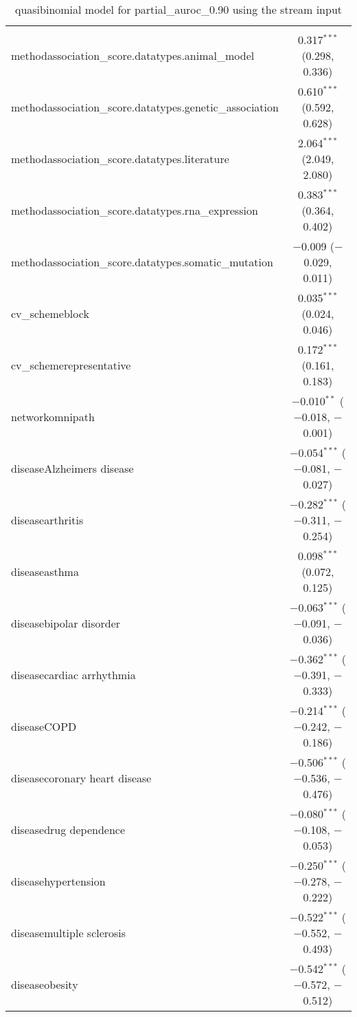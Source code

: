 
\begin{table}[!htbp] \centering 
  \caption{quasibinomial model for partial_auroc_0.90 using the stream input} 
  \label{} 
\begin{tabular}{@{\extracolsep{5pt}}lc} 
\\[-1.8ex]\hline 
\hline \\[-1.8ex] 
 methodassociation\_score.datatypes.animal\_model & 0.317$^{***}$ (0.298, 0.336) \\ 
  methodassociation\_score.datatypes.genetic\_association & 0.610$^{***}$ (0.592, 0.628) \\ 
  methodassociation\_score.datatypes.literature & 2.064$^{***}$ (2.049, 2.080) \\ 
  methodassociation\_score.datatypes.rna\_expression & 0.383$^{***}$ (0.364, 0.402) \\ 
  methodassociation\_score.datatypes.somatic\_mutation & $-$0.009 ($-$0.029, 0.011) \\ 
  cv\_schemeblock & 0.035$^{***}$ (0.024, 0.046) \\ 
  cv\_schemerepresentative & 0.172$^{***}$ (0.161, 0.183) \\ 
  networkomnipath & $-$0.010$^{**}$ ($-$0.018, $-$0.001) \\ 
  diseaseAlzheimers disease & $-$0.054$^{***}$ ($-$0.081, $-$0.027) \\ 
  diseasearthritis & $-$0.282$^{***}$ ($-$0.311, $-$0.254) \\ 
  diseaseasthma & 0.098$^{***}$ (0.072, 0.125) \\ 
  diseasebipolar disorder & $-$0.063$^{***}$ ($-$0.091, $-$0.036) \\ 
  diseasecardiac arrhythmia & $-$0.362$^{***}$ ($-$0.391, $-$0.333) \\ 
  diseaseCOPD & $-$0.214$^{***}$ ($-$0.242, $-$0.186) \\ 
  diseasecoronary heart disease & $-$0.506$^{***}$ ($-$0.536, $-$0.476) \\ 
  diseasedrug dependence & $-$0.080$^{***}$ ($-$0.108, $-$0.053) \\ 
  diseasehypertension & $-$0.250$^{***}$ ($-$0.278, $-$0.222) \\ 
  diseasemultiple sclerosis & $-$0.522$^{***}$ ($-$0.552, $-$0.493) \\ 
  diseaseobesity & $-$0.542$^{***}$ ($-$0.572, $-$0.512) \\ 

\end{tabular}
\end{table}
